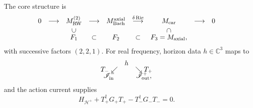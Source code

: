 \documentclass[11pt]{article}
\theoremstyle{definition}
\theoremstyle{remark}
\newcommand{\C}{\mathbb C}
\newcommand{\Ric}{\operatorname{Ric}}
\begin{document}
The core structure is
\[
\begin{array}{ccccccccc}
0&\longrightarrow&M_{\rm RW}^{(2)}
&\longrightarrow&M_{\rm Bach}^{\rm axial}
&\overset{\delta\Ric}{\longrightarrow}&M_{\rm car}
&\longrightarrow&0\\[1mm]
&&\rotatebox{90}{$\subset$}&&&&
\rotatebox{90}{$\supset$}&&\\[-1mm]
&&F_1&\subset&F_2&\subset&F_3=M_{\rm axial},&&
\end{array}
\]
with successive factors \((2,2,1)\).  For real frequency, horizon data
\(h\in\C^3\) maps to
\[
\begin{array}{ccc}
&h&\\[-1mm]
T_- \swarrow && \searrow T_+\\[-1mm]
\mathscr I^-_{\rm in}&&\mathscr I^+_{\rm out},
\end{array}
\]
and the action current supplies
\[
H_{\mathcal H^+}+T_+^\dagger G_+T_+-T_-^\dagger G_-T_-=0.
\]
\end{document}
